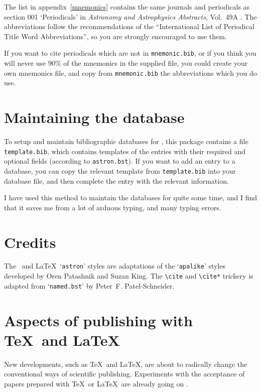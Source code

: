 The list in appendix~\ref{mnemonics} contains the same journals and
periodicals as section 001 `Periodicals' in
{\sl Astronomy and Astrophysics Abstracts}, Vol.~49A \cite{burkhardt}.
The abbreviations follow the recommendations of the ``International
List of Periodical Title Word Abbreviations'', so you are strongly
encouraged to use them.

If you want to cite periodicals which are not in {\tt mnemonic.bib},
or if you think you will never use 90\% of the mnemonics in the
supplied file, you could create your own mnemonics file, and copy
from {\tt mnemonic.bib} the abbreviations which you do use.

\section{Maintaining the database}

To setup and maintain bibliographic databases for \BibTeX, this package
contains a file {\tt template.bib}, which contains templates of the
entries with their required and optional fields (according to
{\tt astron.bst}).
If you want to add an entry to a database, you can copy the relevant
template from {\tt template.bib} into your database file, and then
complete the entry with the relevant information.

I have used this method to maintain the databases for quite some time,
and I find that it saves me from a lot of arduous typing, and many
typing errors.

\section{Credits}

The \BibTeX\ and \LaTeX\ `{\tt astron}' styles are adaptations of the
`{\tt apalike}' styles developed by Oren Patashnik and Suzan King.
The \verb|\cite| and \verb|\cite*| trickery is adapted from
`{\tt named.bst}' by Peter~F. Patel-Schneider.




\appendix

\newpage
\section{Aspects of publishing with \TeX\ and \LaTeX}
\label{aspects}

New developments, such as \TeX\ and \LaTeX, are about to radically change
the conventional ways of scientific publishing.
Experiments with the acceptance of papers prepared with \TeX\ or
\LaTeX\ are already going on \cite{daniel}.

